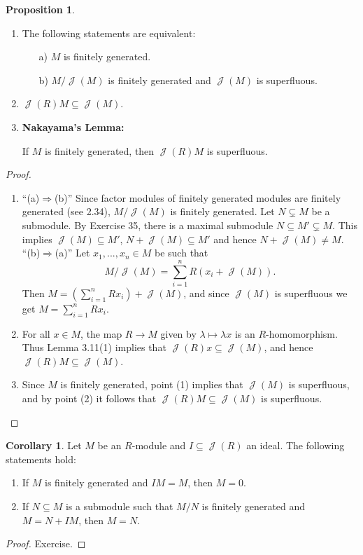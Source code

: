\documentclass[12pt,a4paper]{report}
\theoremstyle{definition}
\newtheorem{corollary}[theorem]{Corollary} %
\newtheorem{proposition}[theorem]{Proposition}
\theoremstyle{num.custom-title}
\DeclareMathOperator{\J}{\mathcal{J}}
\DeclareMathOperator{\imp}{\Rightarrow}
\DeclareMathOperator{\sse}{\subseteq}
\begin{document}
\begin{proposition}\ 
\begin{enumerate} 
\item The following statements are equivalent:
\begin{itemize}
\item[a)] $M$ is finitely generated.
\item[b)] $M/\J(M)$ is finitely generated and $\J(M)$ is superfluous.
\end{itemize}
\item $\J(R)M \sse \J(M)$.
\item \textbf{Nakayama's Lemma:}
\begin{center}
If $M$ is finitely generated, then $\J(R)M$ is superfluous.
\end{center}
\end{enumerate}
\begin{proof}\ 
\begin{enumerate}
\item ``(a)$\imp$(b)'' Since factor modules of finitely generated modules are finitely generated (see 2.34), $M/\J(M)$ is finitely generated. Let $N \subsetneq M$ be a submodule. By Exercise 35, there is a maximal submodule $N \sse M' \subsetneq M$. This implies $\J(M) \sse M'$, $N + \J(M) \sse M'$ and hence $N + \J(M) \neq M$.
\\[6pt]
``(b)$\imp$(a)'' Let $x_1,...,x_n \in M$ be such that
\[
M/\J(M) = \sum_{i=1}^n R(x_i + \J(M)).
\]
Then $M = (\sum_{i=1}^n R x_i) + \J(M)$, and since $\J(M)$ is superfluous we get $M = \sum_{i=1}^n R x_i$.
\item For all $x \in M$, the map $R \to M$ given by $\lambda \mapsto \lambda x$ is an $R$-homomorphism. Thus Lemma 3.11(1) implies that $\J(R) x \sse \J(M)$, and hence $\J(R)M \sse \J(M)$.
\item Since $M$ is finitely generated, point (1) implies that $\J(M)$ is superfluous, and by point (2) it follows that $\J(R)M \sse \J(M)$ is superfluous.
\end{enumerate}
\end{proof}
\end{proposition}

\begin{corollary}
Let $M$ be an $R$-module and $I \sse \J(R)$ an ideal. The following statements hold:
\begin{enumerate}
\item If $M$ is finitely generated and $IM=M$, then $M=0$.
\item If $N \sse M$ is a submodule such that $M/N$ is finitely generated and $M=N+IM$, then $M=N$.
\end{enumerate}
\begin{proof}
Exercise.
\end{proof}
\end{corollary}
\end{document}
